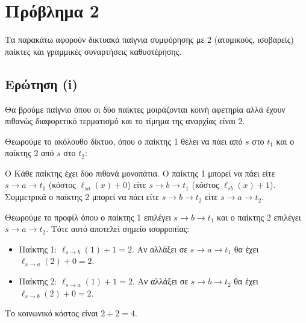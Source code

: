 \section{Πρόβλημα 2}

Τα παρακάτω αφορούν δικτυακά παίγνια συμφόρησης με 2 (ατομικούς, ισοβαρείς)
παίκτες και γραμμικές συναρτήσεις καθυστέρησης.

\subsection{Ερώτηση (i)}

Θα βρούμε παίγνιο όπου οι δύο παίκτες μοιράζονται κοινή αφετηρία αλλά έχουν
πιθανώς διαφορετικό τερματισμό και το τίμημα της αναρχίας είναι 2.

Θεωρούμε το ακόλουθο δίκτυο, όπου ο παίκτης 1 θέλει να πάει από $s$ στο $t_1$
και ο παίκτης 2 από $s$ στο $t_2$:

\begin{center}
\end{center}

Ο Κάθε παίκτης έχει δύο πιθανά μονοπάτια. Ο παίκτης 1 μπορεί να πάει είτε
$s \to a \to t_1$ (κόστος $\ell_{sa}(x) + 0$) είτε $s \to b \to t_1$ (κόστος
$\ell_{sb}(x) + 1$). Συμμετρικά ο παίκτης 2 μπορεί να πάει είτε
$s \to b \to t_2$ είτε $s \to a \to t_2$.

Θεωρούμε το προφίλ όπου ο παίκτης 1 επιλέγει $s \to b \to t_1$ και ο παίκτης 2
επιλέγει $s \to a \to t_2$. Τότε αυτό αποτελεί σημείο ισορροπίας:
\begin{itemize}
  \item Παίκτης 1: $\ell_{s \to b}(1) + 1 = 2$. Αν αλλάξει σε $s \to a \to t_1$
    θα έχει $\ell_{s \to a}(2) + 0 = 2$.
  \item Παίκτης 2: $\ell_{s \to a}(1) + 1 = 2$. Αν αλλάξει σε $s \to b \to t_2$
    θα έχει $\ell_{s \to b}(2) + 0 = 2$.
\end{itemize}
Το κοινωνικό κόστος είναι $2 + 2 = 4$.


